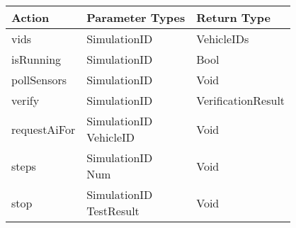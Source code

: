 \def\tabularxcolumn#1{m{#1}}
\begin{tabularx}{.65\linewidth}{X l l}
    \toprule
    \bfseries Action & \bfseries Parameter Types & \bfseries Return Type \\
    \midrule
    vids & SimulationID & VehicleIDs \\
    \midrule
    isRunning & SimulationID & Bool \\
    \midrule
    pollSensors & SimulationID & Void \\
    \midrule
    verify & SimulationID & VerificationResult \\
    \midrule
    requestAiFor & \makecell[l]{SimulationID\\VehicleID} & Void \\
    \midrule
    steps & \makecell[l]{SimulationID\\Num} & Void \\
    \midrule
    stop & \makecell[l]{SimulationID\\TestResult} & Void \\
    \bottomrule
\end{tabularx}
